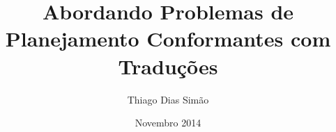 \title{Abordando Problemas de Planejamento Conformantes com Traduções}

\author{Thiago Dias Simão }

% 
% 
\date[LIAMF 2014]{Novembro 2014}


% 
% 
